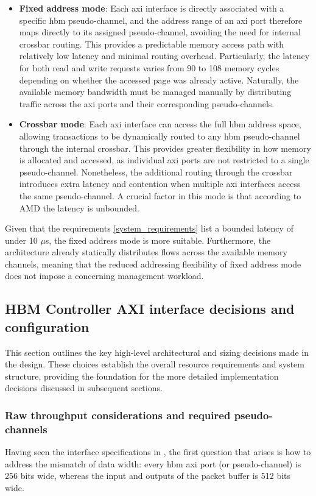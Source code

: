 \begin{itemize}
  \item \textbf{Fixed address mode}: Each \gls{axi} interface is directly associated with a specific \gls{hbm} pseudo-channel, and the address
    range of an \gls{axi} port therefore maps directly to its assigned pseudo-channel, avoiding the need for internal crossbar routing.
    This provides a predictable memory access path with relatively low latency and minimal routing overhead. Particularly, the
    latency for both read and write requests varies from 90 to 108 memory cycles depending on whether the accessed page was already active.
    Naturally, the available memory bandwidth must be managed manually by distributing traffic across the \gls{axi} ports and their
    corresponding pseudo-channels.

  \item \textbf{Crossbar mode}: Each \gls{axi} interface can access the full \gls{hbm} address space, allowing transactions to be dynamically
    routed to any \gls{hbm} pseudo-channel through the internal crossbar. This provides greater flexibility in how memory is
    allocated and accessed, as individual \gls{axi} ports are not restricted to a single pseudo-channel. Nonetheless, the
    additional routing through the crossbar introduces extra latency and contention when multiple \gls{axi} interfaces access
    the same pseudo-channel. A crucial factor in this mode is that according to AMD the latency is unbounded.
\end{itemize}

Given that the requirements \ref{system_requirements} list a bounded latency of under 10 $\mu$s,
the fixed address mode is more suitable. Furthermore, the architecture already statically distributes flows across the available
memory channels, meaning that the reduced addressing flexibility of fixed address mode does not impose a concerning management workload.

\subsection{HBM Controller AXI interface decisions and configuration}
This section outlines the key high-level architectural and sizing decisions made in the design. These choices establish 
the overall resource requirements and system structure, providing the foundation for the more detailed implementation 
decisions discussed in subsequent sections.

\subsubsection{Raw throughput considerations and required pseudo-channels}
Having seen the interface specifications in \cite{amd_pg276_axi_hbm}, the first question that arises is how to
address the mismatch of data width: every \gls{hbm} \gls{axi} port (or pseudo-channel) is 256 bits wide, whereas the input and outputs of
the packet buffer is 512 bits wide.\\

